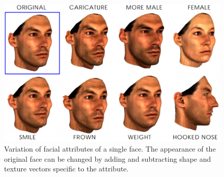 \begin{figure}[t]
\centering
    \includegraphics[width=1.0\columnwidth]{fig/img/blanz_sig99_attris.pdf}
    \vspace{-0.4cm}
    \caption{Variation of facial attributes of a single face. The appearance of the original face can be changed by adding and subtracting shape and texture vectors specific to the attribute.}
    \vspace{-0.6cm}
    \label{fig:blanz_sig99_attris}
\end{figure}

